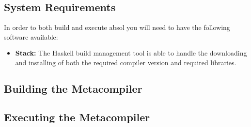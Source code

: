 
\subsection{System Requirements} %
\label{sub:system_requirements}
In order to both build and execute \gls{absol} you will need to have the following software available:
\begin{itemize}
    \item \textbf{Stack:} The Haskell build management tool is able to handle the downloading and installing of both the required compiler version and required libraries.
\end{itemize}


\subsection{Building the Metacompiler} %
\label{sub:building_the_metacompiler}


\subsection{Executing the Metacompiler} %
\label{sub:executing_the_metacompiler}


